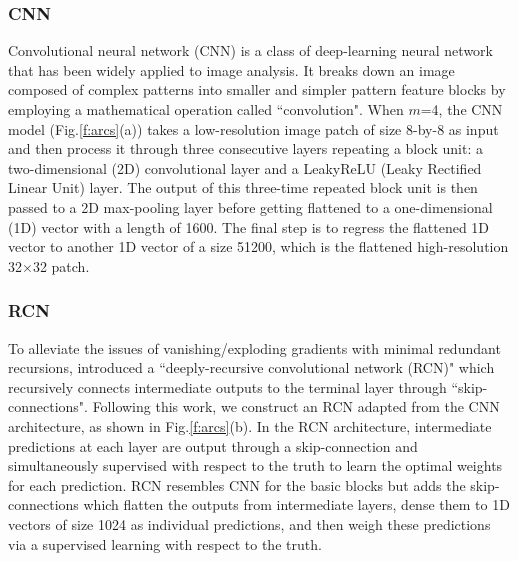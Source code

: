 \documentclass[]{copernicus}
\begin{document}
\subsubsection{CNN}
Convolutional neural network (CNN) is a class of deep-learning neural network that has been widely applied to image analysis. It breaks down an image composed of complex patterns into smaller and simpler pattern feature blocks by employing a mathematical operation called ``convolution". When $m$=4,
 the CNN model (Fig.\ref{f:arcs}(a)) takes a low-resolution image patch of size $8$-by-$8$ as input and then process it through three consecutive layers repeating a block unit: a two-dimensional (2D) convolutional layer and a LeakyReLU (Leaky Rectified Linear Unit) layer. The output of this three-time repeated block unit is then passed to a 2D max-pooling layer before getting flattened to a one-dimensional (1D) vector with a length of 1600. The final step is to regress the flattened 1D vector to another 1D vector of a size 51200, which is the flattened high-resolution 32$\times$32 patch.

\subsubsection{RCN}
To alleviate the issues of vanishing/exploding gradients with minimal redundant recursions, \cite{kim2016deeply} introduced a ``deeply-recursive convolutional network (RCN)" which recursively connects intermediate outputs to the terminal layer through ``skip-connections". Following this work, we construct an RCN adapted from the CNN architecture, as shown in Fig.\ref{f:arcs}(b). In the RCN architecture, intermediate predictions at each layer are output through a skip-connection and simultaneously supervised with respect to the truth to learn the optimal weights for each prediction. RCN resembles CNN for the basic blocks but adds the skip-connections which flatten the outputs from intermediate layers, dense them to 1D vectors of size 1024 as individual predictions, and then weigh these predictions via a supervised learning with respect to the truth. 
\end{document}
